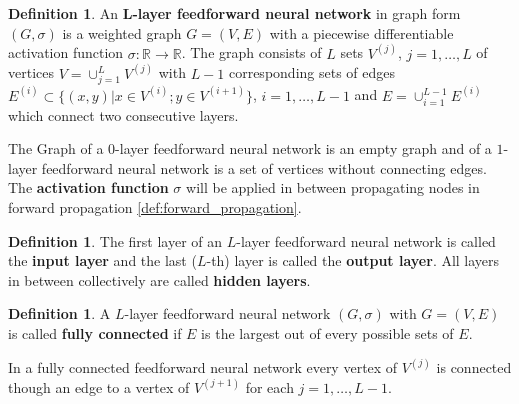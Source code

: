 \documentclass{article}
\theoremstyle{definition}
\newtheorem{definition}[theorem]{Definition}
\begin{document}
\begin{definition}
\label{def:graphFeedForwardNetwork}
An \textbf{L-layer feedforward neural network} in graph form $(G, \sigma)$ is a weighted graph $G=(V, E)$ with a piecewise differentiable activation function $\sigma: \mathbb{R} \to \mathbb{R}$. The graph consists of $L$ sets $V^{(j)}$, $j = 1, \dots , L$ of vertices $V=\cup_{j=1}^{L}V^{(j)}$ with $L-1$ corresponding sets of edges $E^{(i)} \subset \{(x,y)|x \in V^{(i)}; y \in V^{(i+1)}\}$, $i = 1, \dots , L-1$ and $E=\cup_{i=1}^{L-1}E^{(i)}$ which connect two consecutive layers.
\end{definition}

The Graph of a $0$-layer feedforward neural network is an empty graph and of a $1$-layer feedforward neural network is a set of vertices without connecting edges. The \textbf{activation function} $\sigma$ will be applied in between propagating nodes in forward propagation \ref{def:forward_propagation}.

\begin{definition}
The first layer of an $L$-layer feedforward neural network is called the \textbf{input layer} and the last ($L$-th) layer is called the \textbf{output layer}. All layers in between collectively are called \textbf{hidden layers}.
\end{definition}

\begin{definition}
A $L$-layer feedforward neural network $(G, \sigma)$ with $G = (V, E)$ is called \textbf{fully connected} if $E$ is the largest out of every possible sets of $E$.
\end{definition}

In a fully connected feedforward neural network every vertex of $V^{(j)}$ is connected though an edge to a vertex of $V^{(j+1)}$ for each $j = 1, \dots , L-1$.
\end{document}
